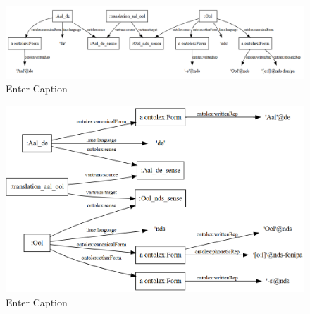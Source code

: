 \begin{figure}
    \centering
    \includegraphics[width=1\linewidth]{aal-rdf-graph.png}
    \caption{Enter Caption}
    \label{fig:enter-label}
\end{figure}

\begin{figure}
    \centering
    \includegraphics[width=1\linewidth]{woewoe-entry-eel.png}
    \caption{Enter Caption}
    \label{fig:enter-label}
\end{figure}

%
%
%

